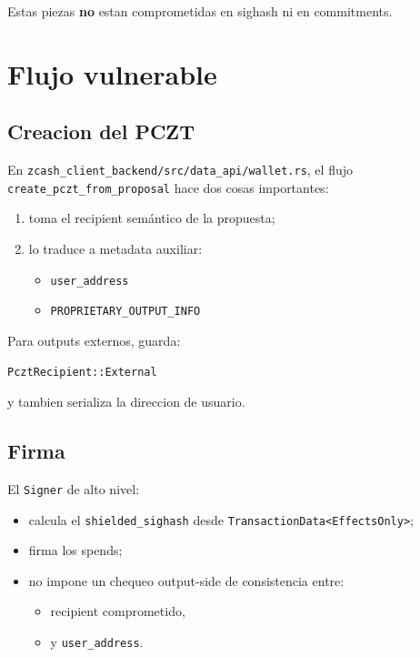 \documentclass[11pt,a4paper]{article}
\begin{document}
Estas piezas \textbf{no} estan comprometidas en sighash ni en commitments.

\section{Flujo vulnerable}

\subsection{Creacion del PCZT}

En \texttt{zcash\_client\_backend/src/data\_api/wallet.rs}, el flujo
\texttt{create\_pczt\_from\_proposal} hace dos cosas importantes:

\begin{enumerate}[leftmargin=2em]
    \item toma el recipient semántico de la propuesta;
    \item lo traduce a metadata auxiliar:
    \begin{itemize}
        \item \texttt{user\_address}
        \item \texttt{PROPRIETARY\_OUTPUT\_INFO}
    \end{itemize}
\end{enumerate}

Para outputs externos, guarda:

\begin{lstlisting}[style=plain]
PcztRecipient::External
\end{lstlisting}

y tambien serializa la direccion de usuario.

\subsection{Firma}

El \texttt{Signer} de alto nivel:

\begin{itemize}[leftmargin=2em]
    \item calcula el \texttt{shielded\_sighash} desde \texttt{TransactionData<EffectsOnly>};
    \item firma los spends;
    \item no impone un chequeo output-side de consistencia entre:
    \begin{itemize}
        \item recipient comprometido,
        \item y \texttt{user\_address}.
    \end{itemize}
\end{itemize}
\end{document}
